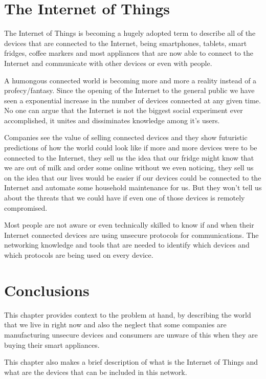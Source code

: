 \section{The Internet of Things}
\label{chap2:sec:iot}
The Internet of Things is becoming a hugely adopted term to describe all of the
devices that are connected to the Internet, being smartphones, tablets, smart
fridges, coffee markers and most appliances that are now able to connect to the
Internet and communicate with other devices or even with people.

A humongous connected world is becoming more and more a reality instead of a
profecy/fantasy. Since the opening of the Internet to the general public we
have seen a exponential increase in the number of devices connected at any
given time. No one can argue that the Internet is not the biggest social
experiment ever accomplished, it unites and dissiminates knowledge among it's
users.

Companies see the value of selling connected devices and they show futuristic
predictions of how the world could look like if more and more devices were to
be connected to the Internet, they sell us the idea that our fridge might know
that we are out of milk and order some online without we even noticing, they
sell us on the idea that our lives would be easier if our devices could be
connected to the Internet and automate some household maintenance for us. But
they won't tell us about the threats that we could have if even one of those
devices is remotely compromised.

Most people are not aware or even technically skilled to know if and when their
Internet connected devices are using unsecure protocols for communications. The
networking knowledge and tools that are needed to identify which devices and
which protocols are being used on every device.

\section{Conclusions}
\label{chap2:sec:concs}
This chapter provides context to the problem at hand, by describing the world
that we live in right now and also the neglect that some companies are
manufacturing unsecure devices and consumers are unware of this when they are
buying their smart appliances.

This chapter also makes a brief description of what is the Internet of Things
and what are the devices that can be included in this network.
